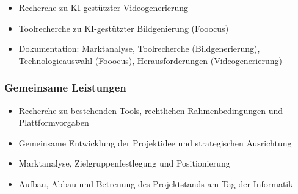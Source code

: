 \documentclass[a4paper,12pt]{article}
\begin{document}
\begin{itemize}
    \item Recherche zu KI-gestützter Videogenerierung
    \item Toolrecherche zu KI-gestützter Bildgenierung (Fooocus)
    \item Dokumentation: Marktanalyse, Toolrecherche (Bildgenerierung), Technologieauswahl (Fooocus), Herausforderungen (Videogenerierung)
\end{itemize}

\subsubsection*{Gemeinsame Leistungen}

\begin{itemize}
    \item Recherche zu bestehenden Tools, rechtlichen Rahmenbedingungen und Plattformvorgaben
    \item Gemeinsame Entwicklung der Projektidee und strategischen Ausrichtung
    \item Marktanalyse, Zielgruppenfestlegung und Positionierung
    \item Aufbau, Abbau und Betreuung des Projektstands am Tag der Informatik
\end{itemize}
\end{document}
